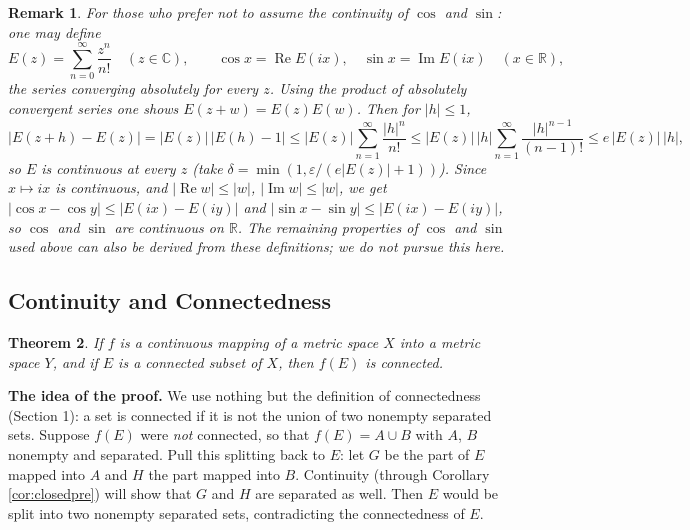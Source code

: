 \documentclass{article}
\theoremstyle{mythm}
\newtheorem{theorem}{Theorem}[section]
\newtheorem{remark}[theorem]{Remark}
\begin{document}
\begin{remark}\label{rem:sincos}
For those who prefer not to assume the continuity of $\cos$ and $\sin$: one may \textit{define}
\[
E(z) = \sum_{n=0}^\infty \frac{z^n}{n!} \quad (z \in \mathbb{C}), \qquad \cos x = \operatorname{Re} E(ix), \quad \sin x = \operatorname{Im} E(ix) \quad (x \in \mathbb{R}),
\]
the series converging absolutely for every $z$. Using the product of absolutely convergent series one shows $E(z + w) = E(z)E(w)$. Then for $|h| \leq 1$,
\[
|E(z + h) - E(z)| = |E(z)|\,|E(h) - 1| \leq |E(z)| \sum_{n=1}^\infty \frac{|h|^n}{n!} \leq |E(z)|\, |h| \sum_{n=1}^\infty \frac{|h|^{n-1}}{(n-1)!} \leq e\,|E(z)|\,|h|,
\]
so $E$ is continuous at every $z$ (take $\delta = \min(1, \varepsilon/(e|E(z)| + 1))$). Since $x \mapsto ix$ is continuous, and $|\operatorname{Re} w| \leq |w|$, $|\operatorname{Im} w| \leq |w|$, we get $|\cos x - \cos y| \leq |E(ix) - E(iy)|$ and $|\sin x - \sin y| \leq |E(ix) - E(iy)|$, so $\cos$ and $\sin$ are continuous on $\mathbb{R}$. The remaining properties of $\cos$ and $\sin$ used above can also be derived from these definitions; we do not pursue this here.
\end{remark}

\subsection{Continuity and Connectedness}

\begin{theorem}\label{thm:connimage}
If $f$ is a continuous mapping of a metric space $X$ into a metric space $Y$, and if $E$ is a connected subset of $X$, then $f(E)$ is connected.
\end{theorem}

\textbf{The idea of the proof.} We use nothing but the definition of connectedness (Section 1): a set is connected if it is not the union of two nonempty separated sets. Suppose $f(E)$ were \textit{not} connected, so that $f(E) = A \cup B$ with $A$, $B$ nonempty and separated. Pull this splitting back to $E$: let $G$ be the part of $E$ mapped into $A$ and $H$ the part mapped into $B$. Continuity (through Corollary \ref{cor:closedpre}) will show that $G$ and $H$ are separated as well. Then $E$ would be split into two nonempty separated sets, contradicting the connectedness of $E$.
\end{document}
